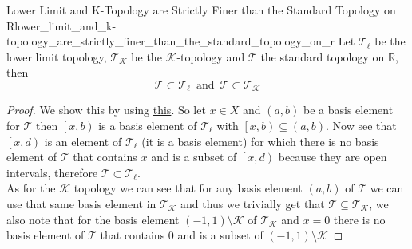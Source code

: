 \begin{proposition}
{Lower Limit and K-Topology are Strictly Finer than the
Standard Topology on
R}{lower_limit_and_k-topology_are_strictly_finer_than_the_standard_topology_on_r}
Let \(\mathcal{T} _{\ell} \) be the lower limit topology, \(\mathcal{T
} _{\mathcal{K}} \) be the \(\mathcal{K} \)-topology and \(
\mathcal{T} \) the standard topology on \(\mathbb{R} \), then
\[
\mathcal{T} \subset \mathcal{T} _{\ell} \enspace \text{and} \enspace
 \mathcal{T} \subset \mathcal{T} _{\mathcal{K}}
\]
\end{proposition}
\begin{proof}
    We show this by using
    \hyperref[proposition:finer_is_equivalent_to_basis_containment]{this}. So
    let \(x \in X \) and \(\left(a, b\right) \) be a basis element for
    \(\mathcal{T} \) then \(\left[ x, b\right) \) is a basis element of
    \(\mathcal{T} _{\ell} \) with \(\left[ x, b\right) \subseteq \left(
    a, b\right) \). Now see that \(\left[ x, d\right) \) is an element of \(
    \mathcal{T} _{\ell} \) (it is a basis element) for which there is no
    basis element of \(\mathcal{T} \) that contains \(x \) and is a subset
    of \(\left[ x, d\right) \) because they are open intervals, therefore \(
    \mathcal{T} \subset \mathcal{T} _{\ell} \).\\
    As for the \(\mathcal{K} \) topology we can see that for any basis
    element \(\left(a, b\right) \) of \(\mathcal{T} \) we can use that
    same basis element in \(\mathcal{T} _{\mathcal{K}} \) and thus we
    trivially get that \(\mathcal{T} \subseteq \mathcal{T} _{\mathcal{K}} \), we
    also note that for the basis element \( \left( -1, 1 \right) \setminus
    \mathcal{ K }   \) of \( \mathcal{ T } _{ \mathcal{ K }   }   \) and \( x =
    0\) there is no basis element of \( \mathcal{ T }   \) that contains \( 0 \)
    and is a subset of \( \left( -1, 1  \right) \setminus \mathcal{ K }   \) 
\end{proof}
